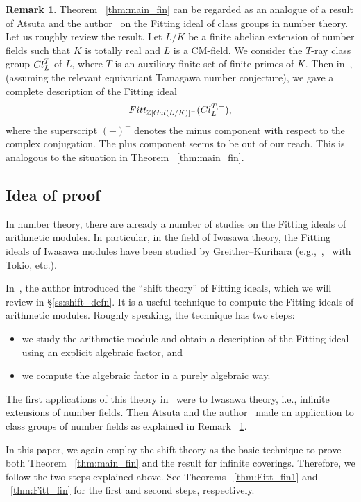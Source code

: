 \documentclass[11pt]{article}
\theoremstyle{definition}
\newtheorem{rema}[theo]{Remark}
\numberwithin{equation}{section}
\newcommand{\Z}{\mathbb{Z}}
\newcommand{\Gal}{{\rm Gal}}
\newcommand{\Fitt}{{\rm Fitt}}
\newcommand{\Cl}{{\rm Cl}}
\begin{document}
\begin{rema}\label{rem:AK}
Theorem ~\ref{thm:main_fin} can be regarded as an analogue of a result of Atsuta and the author~\cite{AK21} on the Fitting ideal of class groups in number theory.
Let us roughly review the result.
Let $L/K$ be a finite abelian extension of number fields such that $K$ is totally real and $L$ is a CM-field.
We consider the $T$-ray class group $\Cl_L^T$ of $L$, where $T$ is an auxiliary finite set of finite primes of $K$.
Then in~\cite{AK21}, (assuming the relevant equivariant Tamagawa number conjecture), we gave a complete description of the Fitting ideal
\[
\Fitt_{\Z[\Gal(L/K)]^-}(\Cl_L^{T, -}),
\]
where the superscript $(-)^-$ denotes the minus component with respect to the complex conjugation.
The plus component seems to be out of our reach.
This is analogous to the situation in Theorem ~\ref{thm:main_fin}.
\end{rema}

\subsection{Idea of proof}\label{ss:comments}

In number theory, there are already a number of studies on the Fitting ideals of arithmetic modules.
In particular, in the field of Iwasawa theory, the Fitting ideals of Iwasawa modules have been studied by Greither--Kurihara (e.g.,~\cite{GK15},~\cite{GKT20} with Tokio, etc.).

In~\cite{Kata_05}, the author introduced the ``shift theory'' of Fitting ideals, which we will review in \S\ref{ss:shift_defn}.
It is a useful technique to compute the Fitting ideals of arithmetic modules.
Roughly speaking, the technique has two steps: 
\begin{itemize}
\item[(1)]
we study the arithmetic module and obtain a description of the Fitting ideal using an explicit algebraic factor, and 
\item[(2)]
we compute the algebraic factor in a purely algebraic way.
\end{itemize}
The first applications of this theory in~\cite{Kata_05} were to Iwasawa theory, i.e., infinite extensions of number fields.
Then Atsuta and the author~\cite{AK21} made an application to class groups of number fields as explained in Remark ~\ref{rem:AK}.

In this paper, we again employ the shift theory as the basic technique to prove both Theorem ~\ref{thm:main_fin} and the result for infinite coverings.
Therefore, we follow the two steps explained above.
See Theorems ~\ref{thm:Fitt_fin1} and ~\ref{thm:Fitt_fin} for the first and second steps, respectively.
\end{document}
